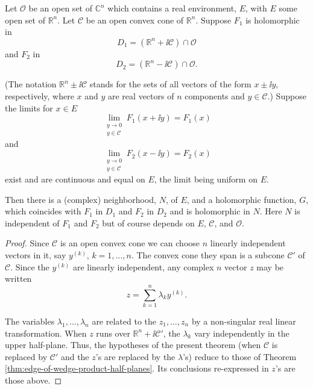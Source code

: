 \begin{theorem}\label{thm:edge-of-wedge-cone}
Let $\mathcal{O}$ be an open set of $\mathbb{C}^n$ which contains a real
environment, $E$, with $E$ some open set of $\mathbb{R}^n$. Let $\mathcal{C}$
be an open convex cone of $\mathbb{R}^n$. Suppose $F_1$ is holomorphic in
\begin{equation}
  D_1=(\mathbb{R}^n+\ii\mathcal{C})\cap\mathcal{O}
  \tag{2-104}\label{eq:ch2-edge-cone-upper-domain}
\end{equation}
and $F_2$ in
\begin{equation}
  D_2=(\mathbb{R}^n-\ii\mathcal{C})\cap\mathcal{O}.
  \tag{2-105}\label{eq:ch2-edge-cone-lower-domain}
\end{equation}

(The notation $\mathbb{R}^n\pm\ii\mathcal{C}$ stands for the sets of
all vectors of the form $x\pm\ii y$, respectively, where $x$ and $y$
are real vectors of $n$ components and $y\in\mathcal{C}$.) Suppose the limits
for $x\in E$
\begin{equation}
  \lim_{\substack{y\to0\\y\in\mathcal{C}}}F_1(x+\ii y)=F_1(x)
  \tag{2-106}\label{eq:ch2-edge-cone-upper-limit}
\end{equation}
and
\begin{equation}
  \lim_{\substack{y\to0\\y\in\mathcal{C}}}F_2(x-\ii y)=F_2(x)
  \tag{2-107}\label{eq:ch2-edge-cone-lower-limit}
\end{equation}
exist and are continuous and equal on $E$, the limit being uniform on $E$.

Then there is a (complex) neighborhood, $N$, of $E$, and a holomorphic
function, $G$, which coincides with $F_1$ in $D_1$ and $F_2$ in $D_2$ and is
holomorphic in $N$. Here $N$ is independent of $F_1$ and $F_2$ but of course
depends on $E$, $\mathcal{C}$, and $\mathcal{O}$.
\end{theorem}

\begin{proof}
Since $\mathcal{C}$ is an open convex cone we can choose $n$ linearly
independent vectors in it, say $y^{(k)}$, $k=1,\ldots,n$. The convex cone they
span is a subcone $\mathcal{C}'$ of $\mathcal{C}$. Since the $y^{(k)}$ are
linearly independent, any complex $n$ vector $z$ may be written
\[
  z=\sum_{k=1}^n\lambda_k y^{(k)}.
\]

The variables $\lambda_1,\ldots,\lambda_n$ are related to the
$z_1,\ldots,z_n$ by a non-singular real linear transformation. When $z$ runs
over $\mathbb{R}^n+\ii\mathcal{C}'$, the $\lambda_k$ vary independently
in the upper half-plane. Thus, the hypotheses of the present theorem (when
$\mathcal{C}$ is replaced by $\mathcal{C}'$ and the $z$'s are replaced by the
$\lambda$'s) reduce to those of Theorem \ref{thm:edge-of-wedge-product-half-planes}. Its conclusions re-expressed in
$z$'s are those above.
\end{proof}

